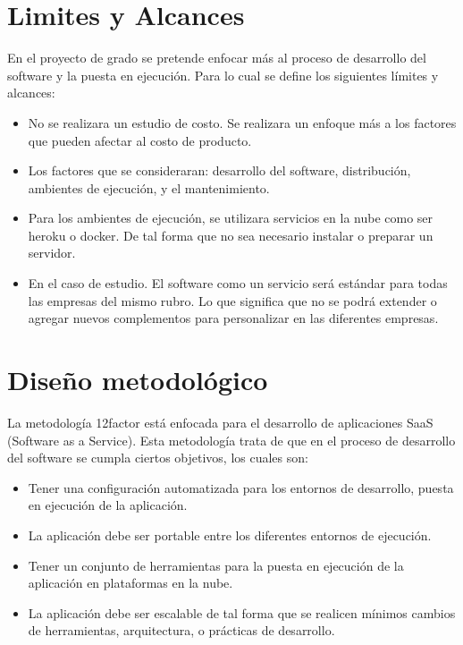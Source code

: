 \section{Limites y Alcances}
\noindent En el proyecto de grado se pretende enfocar más al proceso de desarrollo del software y la puesta en ejecución. Para lo cual se define los siguientes límites y alcances:
\begin{itemize}
  \item No se realizara un estudio de costo. Se realizara un enfoque más a los factores que pueden afectar al costo de producto.
  \item Los factores que se consideraran: desarrollo del software, distribución, ambientes de ejecución, y el mantenimiento.
  \item Para los ambientes de ejecución, se utilizara servicios en la nube como ser heroku o docker. De tal forma que no sea necesario instalar o preparar un servidor.
  \item En el caso de estudio. El software como un servicio será estándar para todas las empresas del mismo rubro. Lo que significa que no se podrá extender o agregar nuevos complementos para personalizar en las diferentes empresas.
\end{itemize}

\section{Diseño metodológico}
\noindent La metodología 12factor está enfocada para el desarrollo de aplicaciones SaaS (Software as a Service). Esta metodología trata de que en el proceso de desarrollo del software se cumpla ciertos objetivos, los cuales son:

\begin{itemize}
  \item Tener una configuración automatizada para los entornos de desarrollo, puesta en ejecución de la aplicación.
  \item La aplicación debe ser portable entre los diferentes entornos de ejecución.
  \item Tener un conjunto de herramientas para la puesta en ejecución de la aplicación en plataformas en la nube.
  \item La aplicación debe ser escalable de tal forma que se realicen mínimos cambios de herramientas, arquitectura, o prácticas de desarrollo.
\end{itemize}

